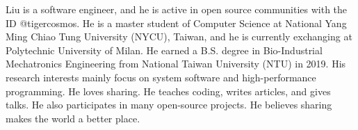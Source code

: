

\begin{cvparagraph}

Liu is a software engineer, and he is active in open source communities with the ID @tigercosmos.
He is a master student of Computer Science at National Yang Ming Chiao Tung University (NYCU), Taiwan, and
he is currently exchanging at Polytechnic University of Milan. 
He earned a B.S. degree in Bio-Industrial Mechatronics Engineering from National Taiwan University (NTU) in 2019.
His research interests mainly focus on system software and high-performance programming.
He loves sharing. He teaches coding, writes articles, and gives talks. He also participates in many open-source projects.
He believes sharing makes the world a better place.
\end{cvparagraph}
